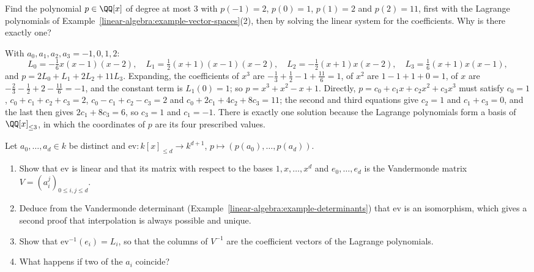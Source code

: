 \begin{exercise}\label{linear-algebra:exercise-lagrange-compute}
Find the polynomial $p \in \QQ[x]$ of degree at most $3$ with $p(-1) = 2$, $p(0) = 1$, $p(1) = 2$ and $p(2) = 11$, first with the Lagrange polynomials of Example~\ref{linear-algebra:example-vector-spaces}(2), then by solving the linear
system for the coefficients. Why is there exactly one?
\end{exercise}

\begin{solution}
With $a_0, a_1, a_2, a_3 = -1, 0, 1, 2$:
\[
L_0 = -\tfrac16x(x - 1)(x - 2), \quad L_1 = \tfrac12(x + 1)(x - 1)(x - 2), \quad L_2 = -\tfrac12(x + 1)x(x - 2), \quad L_3 = \tfrac16(x + 1)x(x - 1),
\]
and $p = 2L_0 + L_1 + 2L_2 + 11L_3$. Expanding, the coefficients of $x^3$ are $-\frac13 + \frac12 - 1 + \frac{11}6 = 1$, of $x^2$ are $1 - 1 + 1 + 0 = 1$, of $x$ are $-\frac23 - \frac12 + 2 - \frac{11}6 = -1$, and the constant
term is $L_1(0) = 1$; so $p = x^3 + x^2 - x + 1$. Directly, $p = c_0 + c_1x + c_2x^2 + c_3x^3$ must satisfy $c_0 = 1$, $c_0 + c_1 + c_2 + c_3 = 2$, $c_0 - c_1 + c_2 - c_3 = 2$ and
$c_0 + 2c_1 + 4c_2 + 8c_3 = 11$; the second and third equations give $c_2 = 1$ and $c_1 + c_3 = 0$, and the last then gives $2c_1 + 8c_3 = 6$, so $c_3 = 1$ and $c_1 = -1$. There is exactly one solution because
the Lagrange polynomials form a basis of $\QQ[x]_{\leq 3}$, in which the coordinates of $p$ are its four prescribed values.
\end{solution}

\begin{exercise}\label{linear-algebra:exercise-lagrange-vandermonde}
Let $a_0, \ldots, a_d \in k$ be distinct and $\mathrm{ev} \colon k[x]_{\leq d} \to k^{d+1}$, $p \mapsto (p(a_0), \ldots, p(a_d))$.
\begin{enumerate}
\item Show that $\mathrm{ev}$ is linear and that its matrix with respect to the bases $1, x, \ldots, x^d$ and $e_0, \ldots, e_d$ is the Vandermonde matrix $V = (a_i^j)_{0 \leq i, j \leq d}$.
\item Deduce from the Vandermonde determinant (Example~\ref{linear-algebra:example-determinants}) that $\mathrm{ev}$ is an isomorphism, which gives a second proof that interpolation is always possible and unique.
\item Show that $\mathrm{ev}^{-1}(e_i) = L_i$, so that the columns of $V^{-1}$ are the coefficient vectors of the Lagrange polynomials.
\item What happens if two of the $a_i$ coincide?
\end{enumerate}
\end{exercise}

